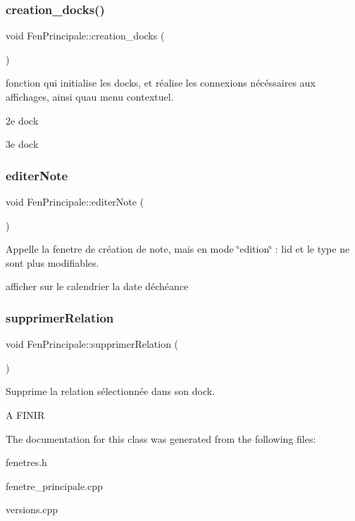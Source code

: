 \subsubsection{\texorpdfstring{creation\+\_\+docks()}{creation\_docks()}}
{\footnotesize\ttfamily void Fen\+Principale\+::creation\+\_\+docks (\begin{DoxyParamCaption}{ }\end{DoxyParamCaption})\hspace{0.3cm}{\ttfamily [protected]}}



fonction qui initialise les docks, et réalise les connexions nécéssaires aux affichages, ainsi qu\textquotesingle{}au menu contextuel. 

2e dock

3e dock \mbox{\label{class_fen_principale_ab8b916f06d0c149b1411781e7129fab5}} 
\subsubsection{\texorpdfstring{editer\+Note}{editerNote}}
{\footnotesize\ttfamily void Fen\+Principale\+::editer\+Note (\begin{DoxyParamCaption}{ }\end{DoxyParamCaption})\hspace{0.3cm}{\ttfamily [slot]}}



Appelle la fenetre de création de note, mais en mode \char`\"{}edition\char`\"{} \+: l\textquotesingle{}id et le type ne sont plus modifiables. 

afficher sur le calendrier la date d\textquotesingle{}échéance \mbox{\label{class_fen_principale_a7dbafe44ea212955ba0b7d674ab5cc9d}} 
\subsubsection{\texorpdfstring{supprimer\+Relation}{supprimerRelation}}
{\footnotesize\ttfamily void Fen\+Principale\+::supprimer\+Relation (\begin{DoxyParamCaption}{ }\end{DoxyParamCaption})\hspace{0.3cm}{\ttfamily [slot]}}



Supprime la relation sélectionnée dans son dock. 

A F\+I\+N\+IR 

The documentation for this class was generated from the following files\+:\begin{DoxyCompactItemize}
\item 
fenetres.\+h\item 
fenetre\+\_\+principale.\+cpp\item 
versions.\+cpp\end{DoxyCompactItemize}
